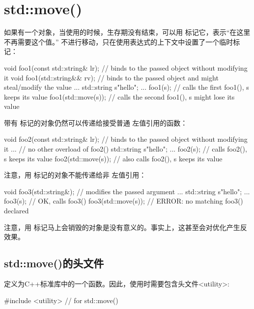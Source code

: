 \section{std::move()}
如果有一个对象，当使用的时候，生存期没有结束，可以用  标记它，表示“在这里不再需要这个值。” 不进行移动，只在使用表达式的上下文中设置了一个临时标记：

\begin{cppcode}
void foo1(const std::string& lr); // binds to the passed object without modifying it
void foo1(std::string&& rv); // binds to the passed object and might steal/modify the value
...
std::string s{"hello"};
...
foo1(s); // calls the first foo1(), s keeps its value
foo1(std::move(s)); // calls the second foo1(), s might lose its value
\end{cppcode}

带有  标记的对象仍然可以传递给接受普通  左值引用的函数：

\begin{cppcode}
void foo2(const std::string& lr); // binds to the passed object without modifying it
... // no other overload of foo2()
std::string s{"hello"};
...
foo2(s); // calls foo2(), s keeps its value
foo2(std::move(s)); // also calls foo2(), s keeps its value
\end{cppcode}

注意，用  标记的对象不能传递给非  左值引用：

\begin{cppcode}
void foo3(std::string&); // modifies the passed argument
...
std::string s{"hello"};
...
foo3(s); // OK, calls foo3()
foo3(std::move(s)); // ERROR: no matching foo3() declared
\end{cppcode}

注意，用  标记马上会销毁的对象是没有意义的。事实上，这甚至会对优化产生反效果。

\subsection{std::move()的头文件}

 定义为C++标准库中的一个函数。因此，使用时需要包含头文件<utility>:

\begin{cppcode}
#include <utility> // for std::move()
\end{cppcode}

